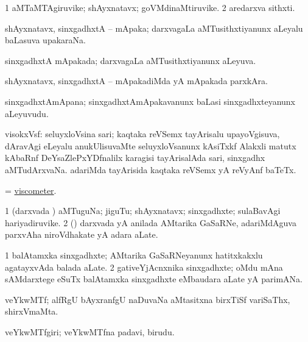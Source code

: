 \bentry
{} 
\gl{\nA}
\expl{}
\bmng
\bnum
\num{1} aMTaMTAgiruvike; shAyxnatavx; goVMdinaMtiruvike. 
\num{2} aredarxva sithxti. 
\enum
\emng
\eentry

\bentry
{} 
\gl{\nA}
\expl{}
\bmng
 shAyxnatavx, sinxgadhxtA -- mApaka; darxvagaLa aMTusithxtiyanunx aLeyalu baLasuva upakaraNa. 
\emng
\eentry

\bentry 
{} 
\gl{\gu}
\expl{}
\bmng
 sinxgadhxtA mApakada; darxvagaLa aMTusithxtiyanunx aLeyuva. 
\emng
\eentry

\bentry
{} 
\gl{\kirxvi}
\expl{}
\bmng
 shAyxnatavx, sinxgadhxtA -- mApakadiMda yA mApakada parxkAra. 
\emng
\eentry

\bentry
{} 
\gl{\nA}
\expl{}
\bmng
 sinxgadhxtAmApana; sinxgadhxtAmApakavanunx baLasi sinxgadhxteyanunx aLeyuvudu. 
\emng
\eentry

\bentry
{} 
\gl{\nA}
\expl{}
\bmng
 visokxVsf: 
\banum
{} seluyxloVsina sari; kaqtaka reVSemx tayArisalu upayoVgisuva, dAravAgi eLeyalu anukUlisuvaMte seluyxloVsanunx kAsiTxkf Alakxli matutx kAbaRnf DeYsaZlePxYDfnalilx karagisi tayArisalAda sari, sinxgadhx aMTudArxvaNa. 
 adariMda tayArisida kaqtaka reVSemx yA reVyAnf baTeTx. 
\eanum
\emng
\eentry


\bentry 
{} 
\gl{\nA}
\expl{}
\bmng
 = \hyperlink{viscometer}{viscometer}. 
\emng
\eentry

\bentry
{} 
\gl{\nA}
\expl{}
\bmng
\bnum
\num{1} (darxvada \vi) aMTuguNa; jiguTu; shAyxnatavx; sinxgadhxte; sulaBavAgi hariyadiruvike. 
\num{2} (\Bwvi) darxvada yA anilada AMtarika GaSaRNe, adariMdAguva parxvAha niroVdhakate yA adara aLate. 
\enum
\emng

\noindent 
\gl{\pagu}
\expl{}
\bmng
\bnum
\num{1}  balAtamxka sinxgadhxte; AMtarika GaSaRNeyanunx hatitxkakxlu agatayxvAda balada aLate. 
\num{2} gativeYjAcnxnika sinxgadhxte; oMdu mAna sAMdarxtege eSuTx balAtamxka sinxgadhxte eMbaudara aLate yA parimANa. 
\enum
\emng
\eentry

\bentry 
{} 
\gl{\nA}
\expl{}
\bmng
 veYkwMTf; alfRgU bAyxranfgU naDuvaNa aMtasitxna birxTiSf variSaThx, shirxVmaMta. 
\emng
\eentry

\bentry 
{} 
\gl{\nA}
\bmng
 veYkwMTfgiri; veYkwMTfna padavi, birudu. 
\emng
\eentry

